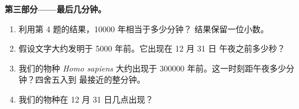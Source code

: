 \begin{problem}
\medskip
\noindent\textbf{第三部分——最后几分钟。}\par\nopagebreak
\begin{enumerate}[resume, beginpenalty=10000]
  \item 利用第 4 题的结果，\num{10000} 年相当于多少分钟？
        结果保留一位小数。
  \item 假设文字大约发明于 \num{5000} 年前。它出现在 12 月 31 日
        午夜之前多少秒？
  \item 我们的物种 \emph{Homo sapiens} 大约出现于 \num{300000}
        年前。这一时刻距午夜多少分钟？四舍五入到
        最接近的整分钟。
  \item 我们的物种在 12 月 31 日几点出现？
\end{enumerate}
\end{problem}
